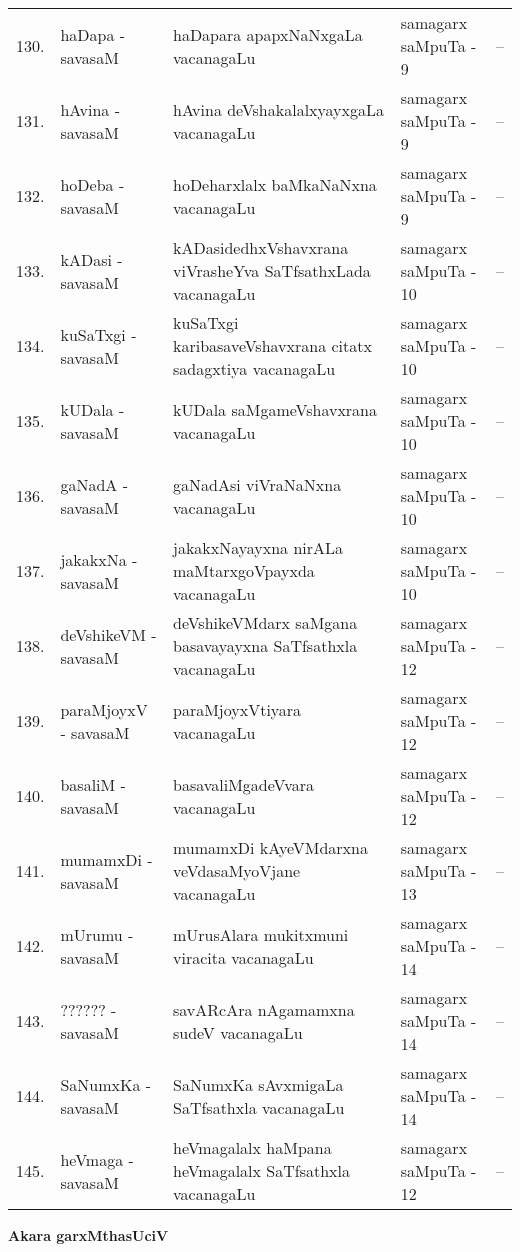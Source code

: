 {\begin{longtable}{rl>{\raggedright}p{5.5cm}lc}
130. & haDapa - savasaM & haDapara apapxNaNxgaLa vacanagaLu & samagarx saMpuTa - 9 & --\\
131. & hAvina - savasaM & hAvina deVshakalalxyayxgaLa vacanagaLu & samagarx saMpuTa - 9 & --\\
132. & hoDeba - savasaM & hoDeharxlalx baMkaNaNxna vacanagaLu & samagarx saMpuTa - 9 & --\\
133. &  kADasi - savasaM & kADasidedhxVshavxrana viVrasheYva SaTfsathxLada vacanagaLu & samagarx saMpuTa - 10 & --\\
134. & kuSaTxgi - savasaM & kuSaTxgi karibasaveVshavxrana citatx sadagxtiya vacanagaLu & samagarx saMpuTa - 10 & --\\
135. & kUDala - savasaM & kUDala saMgameVshavxrana vacanagaLu & samagarx saMpuTa - 10 & --\\
136. & gaNadA - savasaM & gaNadAsi viVraNaNxna vacanagaLu & samagarx saMpuTa - 10 & --\\
137. & jakakxNa - savasaM & jakakxNayayxna nirALa maMtarxgoVpayxda vacanagaLu & samagarx saMpuTa - 10 & --\\
138. & deVshikeVM - savasaM & deVshikeVMdarx saMgana basavayayxna SaTfsathxla vacanagaLu & samagarx saMpuTa - 12 & --\\
139. & paraMjoyxV - savasaM & paraMjoyxVtiyara vacanagaLu & samagarx saMpuTa - 12 & --\\
140. & basaliM - savasaM & basavaliMgadeVvara vacanagaLu & samagarx saMpuTa - 12 & --\\
141. & mumamxDi - savasaM & mumamxDi kAyeVMdarxna veVdasaMyoVjane vacanagaLu & samagarx saMpuTa - 13 & --\\
142. & mUrumu - savasaM & mUrusAlara mukitxmuni viracita vacanagaLu & samagarx saMpuTa - 14 & --\\
143. & ?????? - savasaM &  savARcAra nAgamamxna sudeV vacanagaLu & samagarx saMpuTa - 14 & --\\
144. & SaNumxKa - savasaM & SaNumxKa sAvxmigaLa SaTfsathxla vacanagaLu & samagarx saMpuTa - 14 & --\\
145. & heVmaga - savasaM & heVmagalalx haMpana heVmagalalx SaTfsathxla vacanagaLu & samagarx saMpuTa - 12 & --\\
\hline
\end{longtable}}


\begin{center}
{\Large\bf Akara garxMthasUciV}
\end{center}

